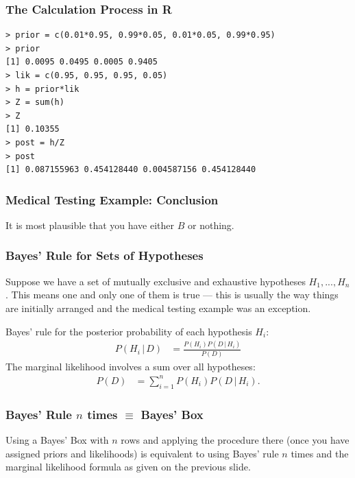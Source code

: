 \documentclass{beamer}
\newcommand{\given}{\,|\,}
\begin{document}
\begin{frame}[fragile]
\frametitle{The Calculation Process in R}

\begin{verbatim}
> prior = c(0.01*0.95, 0.99*0.05, 0.01*0.05, 0.99*0.95)
> prior
[1] 0.0095 0.0495 0.0005 0.9405
> lik = c(0.95, 0.95, 0.95, 0.05)
> h = prior*lik
> Z = sum(h)
> Z
[1] 0.10355
> post = h/Z
> post
[1] 0.087155963 0.454128440 0.004587156 0.454128440
\end{verbatim}

\end{frame}


\begin{frame}
\frametitle{Medical Testing Example: Conclusion}
It is most plausible that you have either $B$ or nothing.

\end{frame}


\begin{frame}
\frametitle{Bayes' Rule for Sets of Hypotheses}
Suppose we have a set of mutually exclusive and exhaustive hypotheses
$H_1, ..., H_n$. This means one and only one of them is true --- this is usually
the way things are initially arranged and the medical testing example was an
exception.\pause

Bayes' rule for the posterior probability of each hypothesis $H_i$:
\begin{align}
P(H_i \given D) &= \frac{P(H_i)P(D \given H_i)}{P(D)}
\end{align}\pause
The marginal likelihood involves a sum over all hypotheses:
\begin{align}
P(D) &= \sum_{i=1}^n P(H_i)P(D \given H_i).
\end{align}

\end{frame}


\begin{frame}
\frametitle{Bayes' Rule $n$ times $\equiv$ Bayes' Box}
Using a Bayes' Box with $n$ rows and applying the procedure there
(once you have assigned priors and likelihoods) is equivalent
to using Bayes' rule $n$ times and the marginal likelihood formula
as given on the previous slide.

\end{frame}
\end{document}
